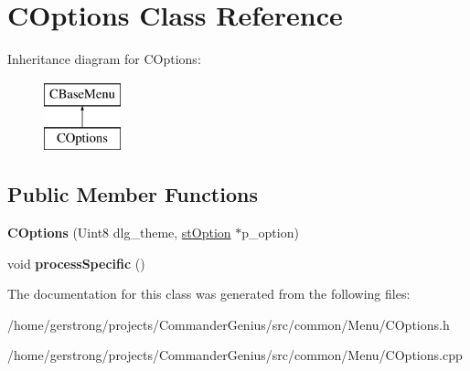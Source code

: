 \hypertarget{class_c_options}{
\section{COptions Class Reference}
\label{class_c_options}
}
Inheritance diagram for COptions:\begin{figure}[H]
\begin{center}
\leavevmode
\includegraphics[height=2cm]{class_c_options}
\end{center}
\end{figure}
\subsection*{Public Member Functions}
\begin{DoxyCompactItemize}
\item 
\hypertarget{class_c_options_a2397aad71916a8d9117329d3e3214d6d}{
{\bfseries COptions} (Uint8 dlg\_\-theme, \hyperlink{structst_option}{stOption} $\ast$p\_\-option)}
\label{class_c_options_a2397aad71916a8d9117329d3e3214d6d}

\item 
\hypertarget{class_c_options_ae734106784691c0d41316e1f369ff4dd}{
void {\bfseries processSpecific} ()}
\label{class_c_options_ae734106784691c0d41316e1f369ff4dd}

\end{DoxyCompactItemize}


The documentation for this class was generated from the following files:\begin{DoxyCompactItemize}
\item 
/home/gerstrong/projects/CommanderGenius/src/common/Menu/COptions.h\item 
/home/gerstrong/projects/CommanderGenius/src/common/Menu/COptions.cpp\end{DoxyCompactItemize}
